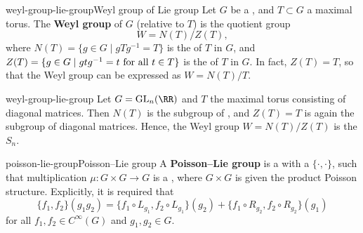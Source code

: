 \begin{topic}{weyl-group-lie-group}{Weyl group of Lie group}
    Let $G$ be a   , and $T \subset G$ a maximal torus. The \textbf{Weyl group} of $G$ (relative to $T$) is the quotient group
    \[ W = N(T) / Z(T) , \]
    where $N(T) = \{ g \in G \mid gTg^{-1} = T \}$ is the  of $T$ in $G$, and $Z(T) = \{ g \in G \mid gtg^{-1} = t \textup{ for all } t \in T \}$ is the  of $T$ in $G$. In fact, $Z(T) = T$, so that the Weyl group can be expressed as $W = N(T) / T$.
\end{topic}

\begin{example}{weyl-group-lie-group}
    Let $G = \textup{GL}_n(\RR)$ and $T$ the maximal torus consisting of diagonal matrices. Then $N(T)$ is the subgroup of , and $Z(T) = T$ is again the subgroup of diagonal matrices. Hence, the Weyl group $W = N(T)/Z(T)$ is the  $S_n$.
\end{example}

\begin{topic}{poisson-lie-group}{Poisson--Lie group}
    A \textbf{Poisson--Lie group} is a  with a  $\{ \cdot, \cdot \}$, such that multiplication $\mu : G \times G \to G$ is a , where $G \times G$ is given the product Poisson structure. Explicitly, it is required that
    \[ \{ f_1, f_2 \}(g_1 g_2) = \{ f_1 \circ L_{g_1}, f_2 \circ L_{g_1} \}(g_2) + \{ f_1 \circ R_{g_2}, f_2 \circ R_{g_2} \}(g_1) \]
    for all $f_1, f_2 \in C^\infty(G)$ and $g_1, g_2 \in G$.
\end{topic}

